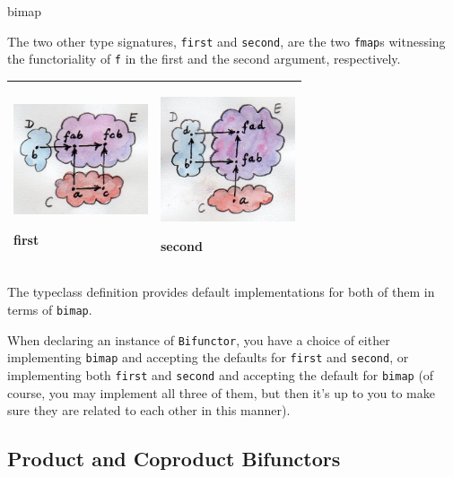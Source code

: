 bimap

The two other type signatures, \texttt{first} and \texttt{second}, are
the two \texttt{fmap}s witnessing the functoriality of \texttt{f} in the
first and the second argument, respectively.

\begin{longtable}[]{@{}ll@{}}
\toprule
\begin{minipage}[t]{0.48\columnwidth}\raggedright\strut
\hypertarget{attachment_4071}{}
\includegraphics[width=1.56250in]{images/first.jpg}

first\strut
\end{minipage} & \begin{minipage}[t]{0.48\columnwidth}\raggedright\strut
\hypertarget{attachment_4072}{}
\includegraphics[width=1.56250in]{images/second.jpg}

second\strut
\end{minipage}\tabularnewline
\bottomrule
\end{longtable}

The typeclass definition provides default implementations for both of
them in terms of \texttt{bimap}.

When declaring an instance of \texttt{Bifunctor}, you have a choice of
either implementing \texttt{bimap} and accepting the defaults for
\texttt{first} and \texttt{second}, or implementing both \texttt{first}
and \texttt{second} and accepting the default for \texttt{bimap} (of
course, you may implement all three of them, but then it's up to you to
make sure they are related to each other in this manner).

\subsection{Product and Coproduct
Bifunctors}\label{product-and-coproduct-bifunctors}

